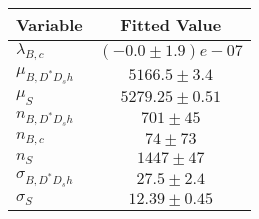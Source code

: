 \begin{tabular}[t]{lc}
\hline
Variable &Fitted Value\\
\hline\hline
$\lambda_{B,c}$&$(-0.0\pm1.9)e-07$\\
\hline
$\mu_{B, D^* D_s h}$&$5166.5\pm3.4$\\
\hline
$\mu_S$&$5279.25\pm0.51$\\
\hline
$n_{B, D^* D_s h}$&$701\pm45$\\
\hline
$n_{B,c}$&$74\pm73$\\
\hline
$n_S$&$1447\pm47$\\
\hline
$\sigma_{B, D^* D_s h}$&$27.5\pm2.4$\\
\hline
$\sigma_S$&$12.39\pm0.45$\\
\hline
\end{tabular}